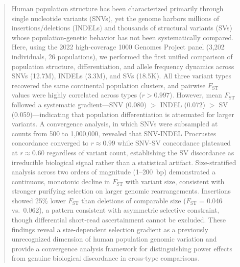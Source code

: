 \begin{abstract}

Human population structure has been characterized primarily through single nucleotide variants (SNVs), yet the genome harbors millions of insertions/deletions (INDELs) and thousands of structural variants (SVs) whose population-genetic behavior has not been systematically compared. Here, using the 2022 high-coverage 1000 Genomes Project panel (3,202 individuals, 26 populations), we performed the first unified comparison of population structure, differentiation, and allele frequency dynamics across SNVs (12.7M), INDELs (3.3M), and SVs (18.5K). All three variant types recovered the same continental population clusters, and pairwise $F_\mathrm{ST}$ values were highly correlated across types ($r > 0.997$). However, mean $F_\mathrm{ST}$ followed a systematic gradient---SNV (0.080) $>$ INDEL (0.072) $>$ SV (0.059)---indicating that population differentiation is attenuated for larger variants. A convergence analysis, in which SNVs were subsampled at counts from 500 to 1,000,000, revealed that SNV-INDEL Procrustes concordance converged to $r \approx 0.99$ while SNV-SV concordance plateaued at $r \approx 0.60$ regardless of variant count, establishing the SV discordance as irreducible biological signal rather than a statistical artifact. Size-stratified analysis across two orders of magnitude (1--200~bp) demonstrated a continuous, monotonic decline in $F_\mathrm{ST}$ with variant size, consistent with stronger purifying selection on larger genomic rearrangements. Insertions showed 25\% lower $F_\mathrm{ST}$ than deletions of comparable size ($F_\mathrm{ST}$ = 0.046 vs.\ 0.062), a pattern consistent with asymmetric selective constraint, though differential short-read ascertainment cannot be excluded. These findings reveal a size-dependent selection gradient as a previously unrecognized dimension of human population genomic variation and provide a convergence analysis framework for distinguishing power effects from genuine biological discordance in cross-type comparisons.

\end{abstract}

